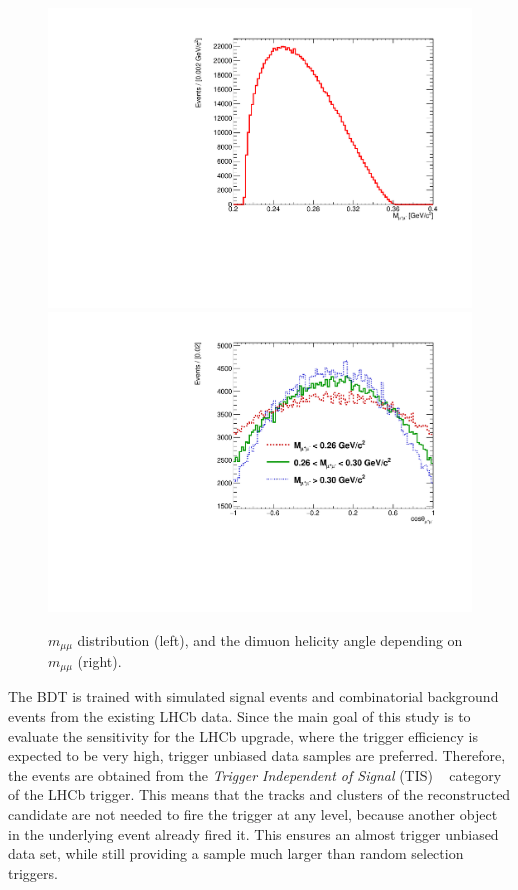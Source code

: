 \begin{figure} [htb!]
\begin{center}
\includegraphics[scale=0.35]{figs/Kspi0MuMu/M_mumu.pdf}
\includegraphics[scale=0.35]{figs/Kspi0MuMu/Hel_mumu.pdf}
\caption{$m_{\mu\mu}$ distribution (left), and the dimuon helicity angle depending on $m_{\mu\mu}$ (right). \label{fig:EviltGen}}
\end{center}
\end{figure}


The BDT is trained with simulated signal events and combinatorial background events from the existing LHCb data.
Since the main goal of this study is to evaluate the sensitivity for the LHCb upgrade, where the
trigger efficiency is expected to be very high, trigger unbiased data samples are preferred.
Therefore, the events are obtained from the {\it Trigger Independent of Signal} (TIS) ~\cite{TISTOS} category of the LHCb trigger. 
This means that the tracks and clusters of the reconstructed candidate are not needed to fire the trigger at any level, because
another object in the underlying event already fired it.
This ensures an almost trigger unbiased data set, while still providing a sample much larger than random selection triggers. 

